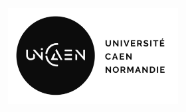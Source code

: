 \begin{titlepage}
\begin{Large}
\begin{figure}[h!]
    \raggedleft
    \includegraphics[width=0.4\textwidth]{Images/LOGO-UNICAEN_V-2.1-N.png}
\end{figure}

\restoregeometry
\end{Large}
\end{titlepage}